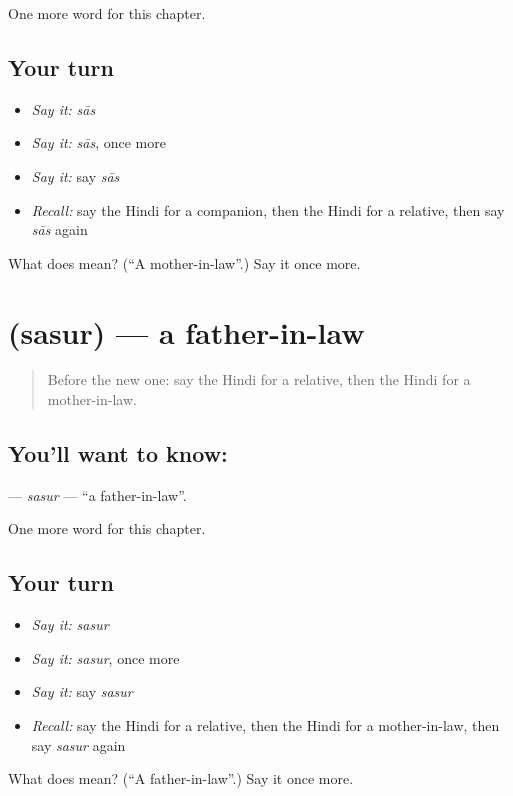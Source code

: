 \begin{grammarlens}[title={What you've built}]
One more word for this chapter.
\end{grammarlens}

\subsection*{Your turn}
\begin{itemize}
\raggedright
  \item \emph{Say it:} \emph{sās}
  \item \emph{Say it:} \emph{sās}, once more
  \item \emph{Say it:} say \emph{sās}
  \item \emph{Recall:} say the Hindi for a companion, then the Hindi for a relative, then say \emph{sās} again
\end{itemize}

\begin{tcolorbox}[breakable,colback=teal!4,colframe=teal!35!black,title={Before you move on}]
What does  mean? (\textquotedblleft{}A mother-in-law\textquotedblright{}.) Say it once more.
\end{tcolorbox}
\section[\texorpdfstring{\hi{ससुर} (sasur)}{ससुर (sasur)}]{ (sasur) — a father-in-law}

\label{lesson:HI-C254-sasur}



\begin{quote}
Before the new one: say the Hindi for a relative, then the Hindi for a mother-in-law.
\end{quote}

\subsection*{You'll want to know: }
\textbf{} — \emph{sasur} — \textquotedblleft{}a father-in-law\textquotedblright{}.

\begin{grammarlens}[title={What you've built}]
One more word for this chapter.
\end{grammarlens}

\subsection*{Your turn}
\begin{itemize}
\raggedright
  \item \emph{Say it:} \emph{sasur}
  \item \emph{Say it:} \emph{sasur}, once more
  \item \emph{Say it:} say \emph{sasur}
  \item \emph{Recall:} say the Hindi for a relative, then the Hindi for a mother-in-law, then say \emph{sasur} again
\end{itemize}

\begin{tcolorbox}[breakable,colback=teal!4,colframe=teal!35!black,title={Before you move on}]
What does  mean? (\textquotedblleft{}A father-in-law\textquotedblright{}.) Say it once more.
\end{tcolorbox}

